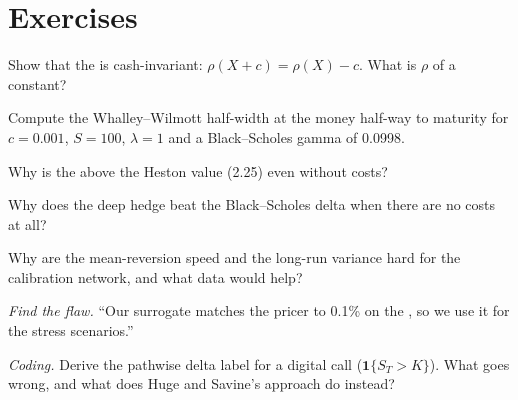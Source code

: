 \section{Exercises}

\begin{exercise}[$\star$]\label{exo:ml:deep-hedging-and-machine-learning-in-pricing:1}
Show that the  is cash-invariant: $\rho(X + c) = \rho(X) - c$. What is $\rho$ of a constant?
\end{exercise}

\begin{exercise}[$\star$]\label{exo:ml:deep-hedging-and-machine-learning-in-pricing:2}
Compute the Whalley--Wilmott half-width at the money half-way to maturity for $c = 0.001$, $S = 100$, $\lambda = 1$ and a
Black--Scholes gamma of 0.0998.
\end{exercise}

\begin{exercise}[$\star$]\label{exo:ml:deep-hedging-and-machine-learning-in-pricing:3}
Why is the  above the Heston value (2.25) even without costs?
\end{exercise}

\begin{exercise}[$\star\star$]\label{exo:ml:deep-hedging-and-machine-learning-in-pricing:4}
Why does the deep hedge beat the Black--Scholes delta when there are no costs at all?
\end{exercise}

\begin{exercise}[$\star\star$]\label{exo:ml:deep-hedging-and-machine-learning-in-pricing:5}
Why are the mean-reversion speed and the long-run variance hard for the calibration network, and what data would help?
\end{exercise}

\begin{exercise}[$\star\star$]\label{exo:ml:deep-hedging-and-machine-learning-in-pricing:6}
\emph{Find the flaw.} ``Our surrogate matches the pricer to 0.1\% on the , so we use it for the stress scenarios.''
\end{exercise}

\begin{exercise}[$\star\star\star$]\label{exo:ml:deep-hedging-and-machine-learning-in-pricing:7}
\emph{Coding.} Derive the pathwise delta label for a digital call ($\mathbf1\{S_T > K\}$). What goes wrong, and what does
Huge and Savine's approach do instead?
\end{exercise}

